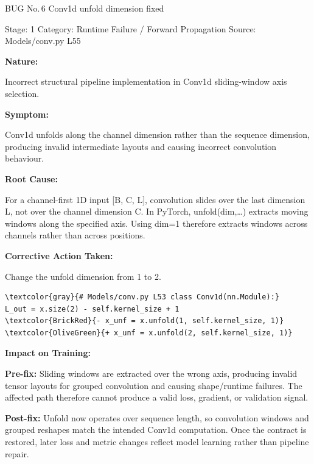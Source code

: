 \documentclass[10pt]{article}
\newcommand{\FieldLabel}[1]{%
 {\bfseries #1:}\par
}
\begin{document}
\begin{bugbox}{BUG No.\,6 \quad Conv1d unfold dimension fixed}
{\color{MetaGray}\small Stage: 1 \;\textbar\; Category: Runtime Failure / Forward Propagation \;\textbar\; Source: Models/conv.py L55\par}
\vspace{0.22em}
\FieldLabel{Nature}
Incorrect structural pipeline implementation in Conv1d sliding-window axis selection.
\par
\vspace{0.35em}
\FieldLabel{Symptom}
Conv1d unfolds along the channel dimension rather than the sequence dimension, producing invalid intermediate layouts and causing incorrect convolution behaviour.
\par
\vspace{0.35em}
\FieldLabel{Root Cause}
For a channel-first 1D input {[}B, C, L{]}, convolution slides over the last dimension L, not over the channel dimension C. In PyTorch, unfold(dim,\ldots) extracts moving windows along the specified axis. Using dim=1 therefore extracts windows across channels rather than across positions.
\par
\vspace{0.35em}
\FieldLabel{Corrective Action Taken}
Change the unfold dimension from 1 to 2.
\par
\vspace{0.35em}
\begin{Verbatim}[commandchars=\\\{\},fontsize=\footnotesize,breaklines=true,breaksymbol={},frame=leftline,framerule=2pt,rulecolor=\color{gray!40},xleftmargin=6pt,formatcom=\singlespacing]
\textcolor{gray}{# Models/conv.py L53 class Conv1d(nn.Module):}
L_out = x.size(2) - self.kernel_size + 1
\textcolor{BrickRed}{- x_unf = x.unfold(1, self.kernel_size, 1)}
\textcolor{OliveGreen}{+ x_unf = x.unfold(2, self.kernel_size, 1)}
\end{Verbatim}
\vspace{0.22em}
\FieldLabel{Impact on Training}
\textbf{Pre-fix:} Sliding windows are extracted over the wrong axis, producing invalid tensor layouts for grouped convolution and causing shape/runtime failures. The affected path therefore cannot produce a valid loss, gradient, or validation signal.\par\smallskip
\textbf{Post-fix:} Unfold now operates over sequence length, so convolution windows and grouped reshapes match the intended Conv1d computation. Once the contract is restored, later loss and metric changes reflect model learning rather than pipeline repair.
\par
\vspace{0.35em}
\end{bugbox}
\end{document}

